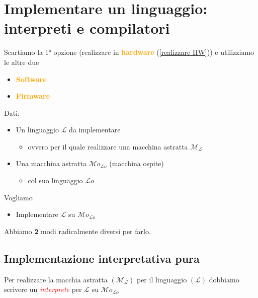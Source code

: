 \documentclass[a4paper,11pt,hidelinks]{book}
\theoremstyle{definition}
\begin{document}
    \newpage
    
\section{Implementare un linguaggio: interpreti e compilatori}
    Scartiamo la 1° opzione (realizzare in \textcolor{orange}{\textbf{hardware}} (\ref{realizzare HW})) e utilizziamo le altre due
    \begin{itemize}
        \item \textcolor{orange}{\textbf{Software}}
        \item \textcolor{orange}{\textbf{Firmware}}
    \end{itemize}
    Dati:
    \begin{itemize}
        \item Un linguaggio $\mathcal{L}$ da implementare
        \begin{itemize}
            \item ovvero per il quale realizzare una macchina astratta $\mathcal{M_L}$
        \end{itemize}
        \item Una macchina astratta $\mathcal{M}o_{\mathcal{L}o}$ (macchina ospite)
        \begin{itemize}
            \item col suo linguaggio $\mathcal{L}o$
        \end{itemize}
    \end{itemize}
    Vogliamo
    \begin{itemize}
        \item Implementare $\mathcal{L}$ su $\mathcal{M}o_{\mathcal{L}o}$
    \end{itemize}
    Abbiamo \textbf{2} modi radicalmente diversi per farlo.

    \subsection{Implementazione interpretativa pura}\label{Implementazione interpretativa pura}
    Per realizzare la macchia astratta $(\mathcal{M_L})$ per il linguaggio $(\mathcal{L})$ dobbiamo scrivere un \textcolor{red}{\textit{interprete}} per $\mathcal{L}$ su $\mathcal{M}o_{\mathcal{L}o}$
    
    \vspace{0.5cm}
    
\end{document}
